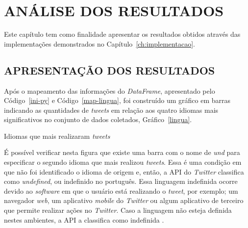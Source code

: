 \chapter{ANÁLISE DOS RESULTADOS}\label{ch:conclusao}

Este capítulo tem como finalidade apresentar os resultados obtidos através das implementações demonstrados no Capítulo~\ref{ch:implementacao}.

\section{APRESENTAÇÃO DOS RESULTADOS}

Após o mapeamento das informações do \textit{DataFrame}, apresentado pelo Código~\ref{ini-py} e Código~\ref{map-lingua}, foi construído um gráfico em barras indicando as quantidades de \textit{tweets} em relação aos quatro idiomas mais significativos no conjunto de dados coletados, Gráfico~\ref{lingua}.

\begin{grafico}[h]
	\centering
	\caption{Idiomas que mais realizaram \textit{tweets}}
	\vspace{-0.3cm}
	\label{lingua}
\end{grafico}

É possível verificar nesta figura que existe uma barra com o nome de \textit{und} para especificar o segundo idioma que mais realizou \textit{tweets}. Essa é uma condição em que não foi identificado o idioma de origem e, então, a API do \textit{Twitter} classifica como \textit{undefined}, ou indefinido no português. Essa linguagem indefinida ocorre devido ao \textit{software} em que o usuário está realizando o \textit{tweet}, por exemplo; um navegador \textit{web}, um aplicativo \textit{mobile} do \textit{Twitter} ou algum aplicativo de terceiro que permite realizar ações no \textit{Twitter}. Caso a linguagem não esteja definida nestes ambientes, a API a classifica como indefinida \cite{twitter-doc}.


